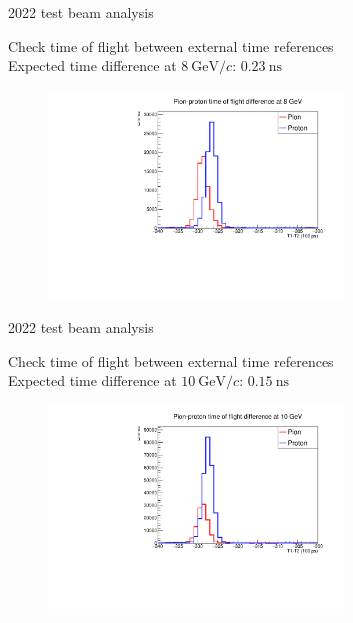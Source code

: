 \documentclass[xcolor={dvipsnames}]{beamer}
\begin{document}
\begin{frame}{2022 test beam analysis}
  \vspace{0.0cm}
  \begin{center}
    {\large Check time of flight between external time references}\\
    {\normalsize Expected time difference at $\SI{8}{\giga\eV/c}$: $\SI{0.23}{\nano\second}$}
  \end{center}
  \begin{figure}
    \centering
    \includegraphics[width = 0.7\textwidth]{Figs/PionProton_TimeDiff_8GeV.pdf}
  \end{figure}
\end{frame}

\begin{frame}{2022 test beam analysis}
  \vspace{0.0cm}
  \begin{center}
    {\large Check time of flight between external time references}\\
    {\normalsize Expected time difference at $\SI{10}{\giga\eV/c}$: $\SI{0.15}{\nano\second}$}
  \end{center}
  \begin{figure}
    \centering
    \includegraphics[width = 0.7\textwidth]{Figs/PionProton_TimeDiff_10GeV.pdf}
  \end{figure}
\end{frame}
\end{document}
